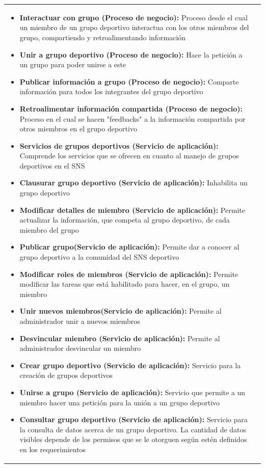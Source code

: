 \begin{table}[!htb]
\begin{center}
{\begin{tabular}{|p{7cm}|p{4cm}|}
\begin{itemize}
				\item \textbf{Interactuar con grupo (Proceso de negocio):} Proceso desde el cual un miembro de un grupo deportivo interactua con los otros miembros del grupo, compartiendo y retroalimentando información
				\item \textbf{Unir a grupo deportivo (Proceso de negocio):} Hace la petición a un grupo para poder unirse a este
				\item \textbf{Publicar información a grupo (Proceso de negocio):} Comparte información para todos los integrantes del grupo deportivo
				\item \textbf{Retroalimentar información compartida (Proceso de negocio):} Proceso en el cual se hacen "feedbacks" a la información compartida por otros miembros en el grupo deportivo
				\item \textbf{Servicios de grupos deportivos (Servicio de aplicación):} Comprende los servicios que se ofrecen en cuanto al manejo de grupos deportivos en el SNS
				\item \textbf{Clausurar grupo deportivo (Servicio de aplicación):} Inhabilita un grupo deportivo
				\item \textbf{Modificar detalles de miembro (Servicio de aplicación):} Permite actualizar la información, que competa al grupo deportivo, de cada miembro del grupo
				\item \textbf{Publicar grupo(Servicio de aplicación):} Permite dar a conocer al grupo deportivo a la comunidad del SNS deportivo
				\item \textbf{Modificar roles de miembros (Servicio de aplicación):} Permite modificar las tareas que está habilitado para hacer, en el grupo, un miembro
				\item \textbf{Unir nuevos miembros(Servicio de aplicación):} Permite al administrador unir a nuevos miembros
				\item \textbf{Desvincular miembro (Servicio de aplicación):} Permite al administrador desvincular un miembro
				\item \textbf{Crear grupo deportivo (Servicio de aplicación):} Servicio para la creación de grupos deportivos
				\item \textbf{Unirse a grupo (Servicio de aplicación):} Servicio que permite a un miembro hacer una petición para la unión a un grupo deportivo
				\item \textbf{Consultar grupo deportivo (Servicio de aplicación):} Servicio para la consulta de datos acerca de un grupo deportivo. La cantidad de datos visibles depende de los permisos que se le otorguen según estén definidos en los requerimientos

\end{itemize}
\end{tabular}}
\end{center}
\end{table}
